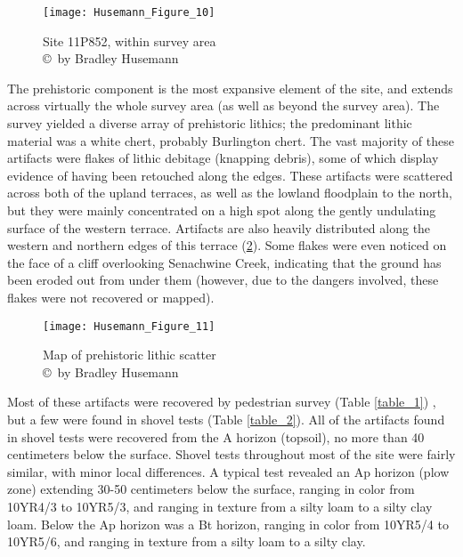 \begin{figure}[!p]
	\texttt{[image: Husemann\_Figure\_10]}
	\caption{Site 11P852, within survey area
		{\normalfont\scriptsize \\ \copyright\ by Bradley Husemann
	}}
	\label{fig:Husemann_Figure_10}
\end{figure}



The prehistoric component is the most expansive element of the site, and extends across virtually the whole survey area (as well as beyond the survey area). The survey yielded a diverse array of prehistoric lithics; the predominant lithic material was a white chert, probably Burlington chert. The vast majority of these artifacts were flakes of lithic debitage (knapping debris), some of which display evidence of having been retouched along the edges. These artifacts were scattered across both of the upland terraces, as well as the lowland floodplain to the north, but they were mainly concentrated on a high spot along the gently undulating surface of the western terrace. Artifacts are also heavily distributed along the western and northern edges of this terrace (\cref{fig:Husemann_Figure_11}). Some flakes were even noticed on the face of a cliff overlooking Senachwine Creek, indicating that the ground has been eroded out from under them (however, due to the dangers involved, these flakes were not recovered or mapped).

\begin{figure}[!p]
	\texttt{[image: Husemann\_Figure\_11]}
	\caption{Map of prehistoric lithic scatter
		{\normalfont\scriptsize \\ \copyright\ by Bradley Husemann
	}}
	\label{fig:Husemann_Figure_11}
\end{figure}

Most of these artifacts were recovered by pedestrian survey (Table \ref{table_1})
, but a few were found in shovel tests (Table \ref{table_2}). All of the artifacts found in shovel tests were recovered from the A horizon (topsoil), no more than 40 centimeters below the surface. Shovel tests throughout most of the site were fairly similar, with minor local differences.  A typical test revealed an Ap horizon (plow zone) extending 30-50 centimeters below the surface, ranging in color from 10YR4/3 to 10YR5/3, and ranging in texture from a silty loam to a silty clay loam.  Below the Ap horizon was a Bt horizon, ranging in color from 10YR5/4 to 10YR5/6, and ranging in texture from a silty loam to a silty clay.

